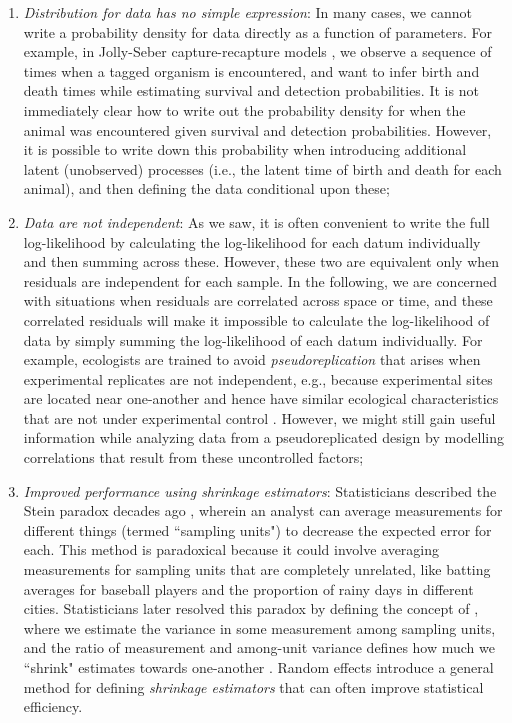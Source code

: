 \begin{enumerate}
    \item \textit{Distribution for data has no simple expression}: In many cases, we cannot write a probability density for data directly as a function of parameters.  For example, in Jolly-Seber capture-recapture models \cite{jolly_explicit_1965,seber_note_1965}, we observe a sequence of times when a tagged organism is encountered, and want to infer birth and death times while estimating survival and detection probabilities. It is not immediately clear how to write out the probability density for when the animal was encountered given survival and detection probabilities.  However, it is possible to write down this probability when introducing additional latent (unobserved) processes (i.e., the latent time of birth and death for each animal), and then defining the data conditional upon these;

    \item \textit{Data are not independent}:  As we saw, it is often convenient to write the full log-likelihood by calculating the log-likelihood for each datum individually and then summing across these.  However, these two are equivalent only when residuals are independent for each sample.  In the following, we are concerned with situations when residuals are correlated across space or time, and these correlated residuals will make it impossible to calculate the log-likelihood of data by simply summing the log-likelihood of each datum individually.  For example, ecologists are trained to avoid \textit{pseudoreplication} that arises when experimental replicates are not independent, e.g., because experimental sites are located near one-another and hence have similar ecological characteristics that are not under experimental control \cite{hurlbert_pseudoreplication_1984}.  However, we might still gain useful information while analyzing data from a pseudoreplicated design by modelling correlations that result from these uncontrolled factors;

    \item \textit{Improved performance using shrinkage estimators}: Statisticians described the Stein paradox decades ago \cite{stein_inadmissibility_1956}, wherein an analyst can average measurements for different things (termed ``sampling units") to decrease the expected error for each.  This method is paradoxical because it could involve averaging measurements for sampling units that are completely unrelated, like batting averages for baseball players and the proportion of rainy days in different cities.  Statisticians later resolved this paradox by defining the concept of , where we estimate the variance in some measurement among sampling units, and the ratio of measurement and among-unit variance defines how much we ``shrink" estimates towards one-another \cite{efron_steins_1977}.  Random effects introduce a general method for defining \textit{shrinkage estimators} that can often improve statistical efficiency.  
\end{enumerate}
